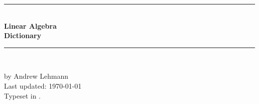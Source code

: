 \thispagestyle{empty}
\begin{titlepage}

\newcommand{\HRule}{\rule{\linewidth}{0.5mm}} %

\center %
 

\vspace*{8cm}

\HRule \\[0.4cm]
\vspace{0.5cm}
{ \fontsize{40}{10} \bfseries Linear Algebra} \\ [1cm]
{ \huge \bfseries Dictionary} \\ \vspace{0.5cm}
\HRule \\[10cm]
 

\begin{minipage}{0.4\textwidth}
\centering by Andrew Lehmann \\
\centering Last updated: \today \\
Typeset in \LaTeXe.
\end{minipage}


\end{titlepage}
